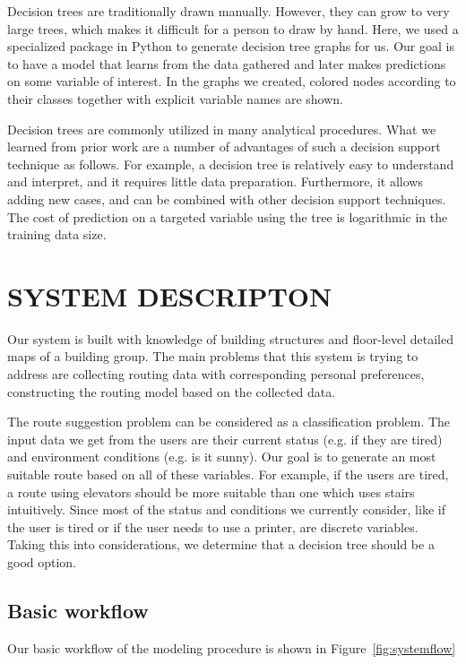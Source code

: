 \documentclass{sigchi}
\begin{document}
Decision trees are traditionally drawn manually. However, they can grow to very large trees, which makes it difficult for a person to draw by hand. Here, we used a specialized package in Python to generate decision tree graphs for us. Our goal is to have a model that learns from the data gathered and later makes predictions on some variable of interest. In the graphs we created, colored nodes according to their classes together with explicit variable names are shown. 


Decision trees are commonly utilized in many analytical procedures. What we learned from prior work are a number of advantages of such a decision support technique as follows. For example, a decision tree is relatively easy to understand and interpret, and it requires little data preparation. Furthermore, it allows adding new cases, and can be combined with other decision support techniques. The cost of prediction on a targeted variable using the tree is logarithmic in the training data size.

\section{SYSTEM DESCRIPTON}

Our system is built with knowledge of building structures and floor-level detailed maps of a building group. The main problems that this system is trying to address are collecting routing data with corresponding personal preferences, constructing the routing model based on the collected data. 


The route suggestion problem can be considered as a classification problem. The input data we get from the users are their current status (e.g. if they are tired) and environment conditions (e.g. is it sunny). Our goal is to generate an most suitable route based on all of these variables. For example, if the users are tired, a route using elevators should be more suitable than one which uses stairs intuitively. Since most of the status and conditions we currently consider, like if the user is tired or if the user needs to use a printer, are discrete variables. Taking this into considerations, we determine that a decision tree should be a good option.


\subsection{Basic workflow}

Our basic workflow of the modeling procedure is shown in Figure~\ref{fig:systemflow}
\end{document}
